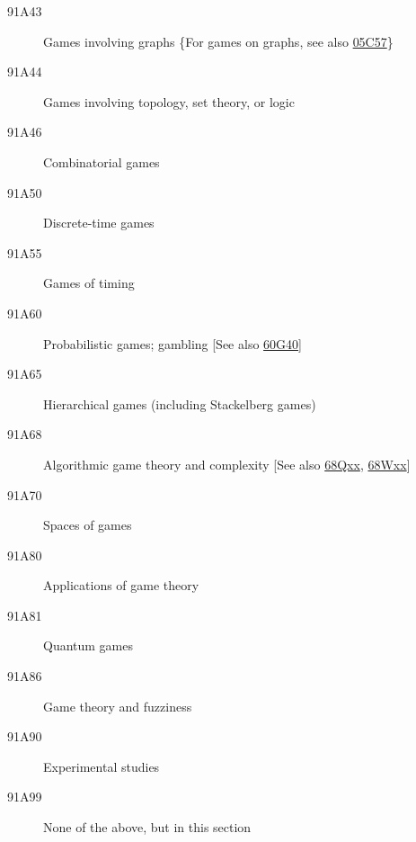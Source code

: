 \documentclass[letterpaper]{article}
\begin{document}
\begin{description}
\item [91A43]\label{91A43} Games involving graphs \{For games on graphs, see also \hyperref[05C57]{05C57}\}
\item [91A44]\label{91A44} Games involving topology, set theory, or logic
\item [91A46]\label{91A46} Combinatorial games
\item [91A50]\label{91A50} Discrete-time games
\item [91A55]\label{91A55} Games of timing
\item [91A60]\label{91A60} Probabilistic games; gambling [See also \hyperref[60G40]{60G40}]
\item [91A65]\label{91A65} Hierarchical games (including Stackelberg games)
\item [91A68]\label{91A68} Algorithmic game theory and complexity [See also \hyperref[68Qxx]{68Qxx}, \hyperref[68Wxx]{68Wxx}]
\item [91A70]\label{91A70} Spaces of games
\item [91A80]\label{91A80} Applications of game theory
\item [91A81]\label{91A81} Quantum games
\item [91A86]\label{91A86} Game theory and fuzziness
\item [91A90]\label{91A90} Experimental studies
\item [91A99]\label{91A99} None of the above, but in this section
\end{description}
\end{document}
